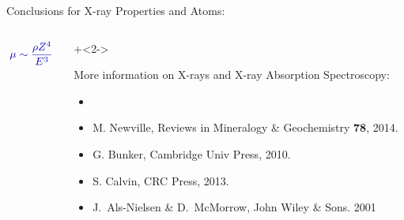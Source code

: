 \begin{slide}{ Conclusions for X-ray Properties and Atoms: }
\begin{columns}[T]
\begin{column}{35mm}
{    \Large \[ {\Blue{ \mu \sim \frac{\rho Z^4}{ E^3} }} \]

  }

  \vmm\vmm\vfill
  \end{column}
  \begin{column}{95mm}
\onslide+<2->{
  \small{
       More information on X-rays and X-ray Absorption Spectroscopy:

  \begin{itemize}
  \item[] {}
  \item[] {} M. Newville, Reviews in  Mineralogy \& Geochemistry {\bf{78}}, 2014.
  \item[] {} G. Bunker, Cambridge Univ  Press,  2010.
  \item[] {} S. Calvin, CRC Press, 2013.
  \item[]  {}  J.~Als-Nielsen
    \& D.~McMorrow,  John Wiley \& Sons. 2001
    
  \end{itemize}
}
}
  \end{column}
  \end{columns}
  

 

 \vfill
\end{slide}
 




